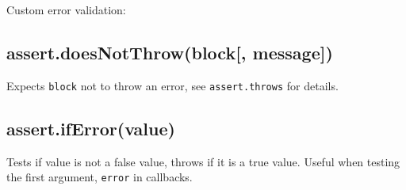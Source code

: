Custom error validation:

\begin{Shaded}
\begin{Highlighting}[]
\NormalTok{(}
  \NormalTok{() \{}
      \NormalTok{(}\NormalTok{);}
  \NormalTok{\},}
      
       \NormalTok{;}
    \NormalTok{\}}
  \NormalTok{\},}
\NormalTok{);}
\end{Highlighting}
\end{Shaded}

\subsection{assert.doesNotThrow(block{[},
message{]})}\label{assert.doesnotthrowblock-message}

Expects \texttt{block} not to throw an error, see \texttt{assert.throws}
for details.

\subsection{assert.ifError(value)}\label{assert.iferrorvalue}

Tests if value is not a false value, throws if it is a true value.
Useful when testing the first argument, \texttt{error} in callbacks.

